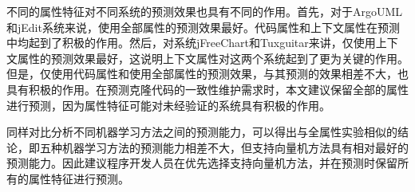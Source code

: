 不同的属性特征对不同系统的预测效果也具有不同的作用。首先，对于ArgoUML和jEdit系统来说，使用全部属性的预测效果最好。代码属性和上下文属性在预测中均起到了积极的作用。然后，对系统jFreeChart和Tuxguitar来讲，仅使用上下文属性的预测效果最好，这说明上下文属性对这两个系统起到了更为关键的作用。但是，仅使用代码属性和使用全部属性的预测效果，与其预测的效果相差不大，也具有积极的作用。在预测克隆代码的一致性维护需求时，本文建议保留全部的属性进行预测，因为属性特征可能对未经验证的系统具有积极的作用。

同样对比分析不同机器学习方法之间的预测能力，可以得出与全属性实验相似的结论，即五种机器学习方法的预测能力相差不大，但支持向量机方法具有相对最好的预测能力。因此建议程序开发人员在优先选择支持向量机方法，并在预测时保留所有的属性特征进行预测。



